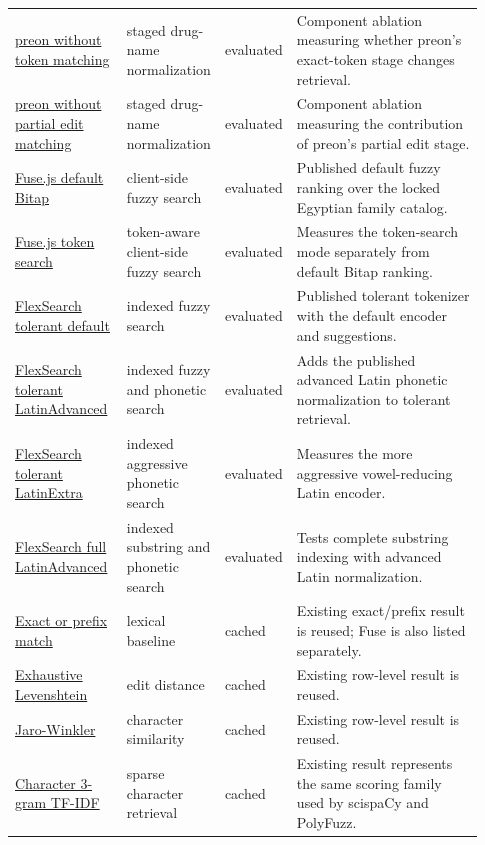 \begin{landscape}
\begin{scriptsize}
\begin{longtable}{@{}L{0.24\linewidth}L{0.15\linewidth}L{0.12\linewidth}L{0.42\linewidth}@{}}
\href{https://github.com/ermshaua/preon}{preon without token matching} & staged drug-name normalization & evaluated & Component ablation measuring whether preon's exact-token stage changes retrieval. \\
\href{https://github.com/ermshaua/preon}{preon without partial edit matching} & staged drug-name normalization & evaluated & Component ablation measuring the contribution of preon's partial edit stage. \\
\href{https://github.com/krisk/Fuse}{Fuse.js default Bitap} & client-side fuzzy search & evaluated & Published default fuzzy ranking over the locked Egyptian family catalog. \\
\href{https://github.com/krisk/Fuse}{Fuse.js token search} & token-aware client-side fuzzy search & evaluated & Measures the token-search mode separately from default Bitap ranking. \\
\href{https://github.com/nextapps-de/flexsearch}{FlexSearch tolerant default} & indexed fuzzy search & evaluated & Published tolerant tokenizer with the default encoder and suggestions. \\
\href{https://github.com/nextapps-de/flexsearch}{FlexSearch tolerant LatinAdvanced} & indexed fuzzy and phonetic search & evaluated & Adds the published advanced Latin phonetic normalization to tolerant retrieval. \\
\href{https://github.com/nextapps-de/flexsearch}{FlexSearch tolerant LatinExtra} & indexed aggressive phonetic search & evaluated & Measures the more aggressive vowel-reducing Latin encoder. \\
\href{https://github.com/nextapps-de/flexsearch}{FlexSearch full LatinAdvanced} & indexed substring and phonetic search & evaluated & Tests complete substring indexing with advanced Latin normalization. \\
\href{https://github.com/krisk/Fuse}{Exact or prefix match} & lexical baseline & cached & Existing exact/prefix result is reused; Fuse is also listed separately. \\
\href{https://github.com/rapidfuzz/RapidFuzz}{Exhaustive Levenshtein} & edit distance & cached & Existing row-level result is reused. \\
\href{https://github.com/jamesturk/jellyfish}{Jaro-Winkler} & character similarity & cached & Existing row-level result is reused. \\
\href{https://github.com/allenai/scispacy}{Character 3-gram TF-IDF} & sparse character retrieval & cached & Existing result represents the same scoring family used by scispaCy and PolyFuzz. \\

\end{longtable}
\end{scriptsize}
\end{landscape}
